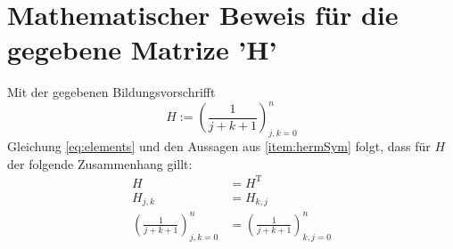 \section{Mathematischer Beweis für die gegebene Matrize 'H'}
Mit der gegebenen Bildungsvorschrifft
\begin{equation}
    H := \left(\frac{1}{j+k+1}\right)_{j,k=0}^{n}
\end{equation}
Gleichung \ref{eq:elements} und den Aussagen aus \ref{item:hermSym} folgt, dass für \(H\) der
folgende Zusammenhang gillt:
\begin{align}
                                           H &= H^{\mathrm T} \\
                                     H_{j,k} &= H_{k,j}       \\
    \left(\frac{1}{j+k+1}\right)_{j,k=0}^{n} &= \left(\frac{1}{j+k+1}\right)_{k,j=0}^{n}
\end{align}